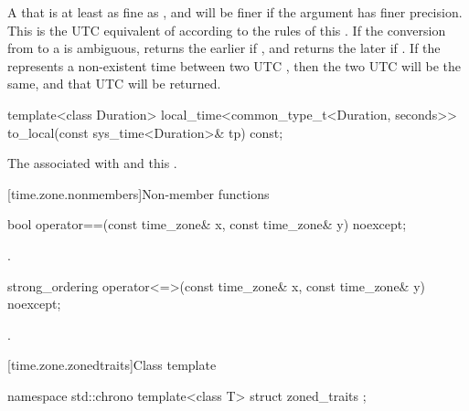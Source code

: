 \begin{itemdescr}
\pnum
\returns
A  that is at least as fine as ,
and will be finer if the argument  has finer precision.
This  is the UTC equivalent of 
according to the rules of this .
If the conversion from  to a  is ambiguous,
returns the earlier  if , and
returns the later  if .
If the  represents a non-existent time between two UTC ,
then the two UTC  will be the same,
and that UTC  will be returned.
\end{itemdescr}

%
\begin{itemdecl}
template<class Duration>
  local_time<common_type_t<Duration, seconds>>
    to_local(const sys_time<Duration>& tp) const;
\end{itemdecl}

\begin{itemdescr}
\pnum
\returns
The  associated with  and this .
\end{itemdescr}

[time.zone.nonmembers]{Non-member functions}

%
\begin{itemdecl}
bool operator==(const time_zone& x, const time_zone& y) noexcept;
\end{itemdecl}

\begin{itemdescr}
\pnum
\returns
{}.
\end{itemdescr}

%
\begin{itemdecl}
strong_ordering operator<=>(const time_zone& x, const time_zone& y) noexcept;
\end{itemdecl}

\begin{itemdescr}
\pnum
\returns
{}.
\end{itemdescr}

[time.zone.zonedtraits]{Class template }

\begin{codeblock}
namespace std::chrono {
  template<class T> struct zoned_traits {};
}
\end{codeblock}

